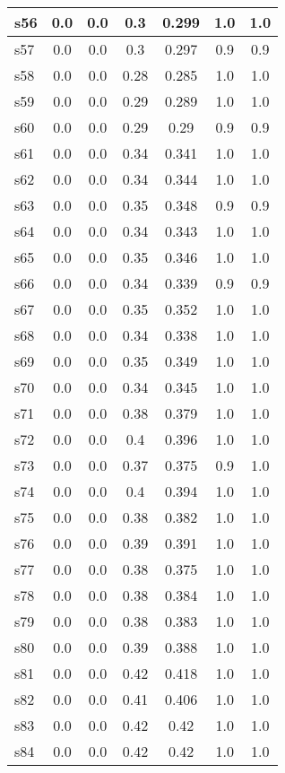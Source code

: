 \documentclass{article}
\begin{document}
\begin{tabular}{|l|c|c|c|c|c|c|}
\hline
s56 &0.0 & 0.0 & 0.3 & 0.299 & 1.0 & 1.0\\
\hline
s57 &0.0 & 0.0 & 0.3 & 0.297 & 0.9 & 0.9\\
\hline
s58 &0.0 & 0.0 & 0.28 & 0.285 & 1.0 & 1.0\\
\hline
s59 &0.0 & 0.0 & 0.29 & 0.289 & 1.0 & 1.0\\
\hline
s60 &0.0 & 0.0 & 0.29 & 0.29 & 0.9 & 0.9\\
\hline
s61 &0.0 & 0.0 & 0.34 & 0.341 & 1.0 & 1.0\\
\hline
s62 &0.0 & 0.0 & 0.34 & 0.344 & 1.0 & 1.0\\
\hline
s63 &0.0 & 0.0 & 0.35 & 0.348 & 0.9 & 0.9\\
\hline
s64 &0.0 & 0.0 & 0.34 & 0.343 & 1.0 & 1.0\\
\hline
s65 &0.0 & 0.0 & 0.35 & 0.346 & 1.0 & 1.0\\
\hline
s66 &0.0 & 0.0 & 0.34 & 0.339 & 0.9 & 0.9\\
\hline
s67 &0.0 & 0.0 & 0.35 & 0.352 & 1.0 & 1.0\\
\hline
s68 &0.0 & 0.0 & 0.34 & 0.338 & 1.0 & 1.0\\
\hline
s69 &0.0 & 0.0 & 0.35 & 0.349 & 1.0 & 1.0\\
\hline
s70 &0.0 & 0.0 & 0.34 & 0.345 & 1.0 & 1.0\\
\hline
s71 &0.0 & 0.0 & 0.38 & 0.379 & 1.0 & 1.0\\
\hline
s72 &0.0 & 0.0 & 0.4 & 0.396 & 1.0 & 1.0\\
\hline
s73 &0.0 & 0.0 & 0.37 & 0.375 & 0.9 & 1.0\\
\hline
s74 &0.0 & 0.0 & 0.4 & 0.394 & 1.0 & 1.0\\
\hline
s75 &0.0 & 0.0 & 0.38 & 0.382 & 1.0 & 1.0\\
\hline
s76 &0.0 & 0.0 & 0.39 & 0.391 & 1.0 & 1.0\\
\hline
s77 &0.0 & 0.0 & 0.38 & 0.375 & 1.0 & 1.0\\
\hline
s78 &0.0 & 0.0 & 0.38 & 0.384 & 1.0 & 1.0\\
\hline
s79 &0.0 & 0.0 & 0.38 & 0.383 & 1.0 & 1.0\\
\hline
s80 &0.0 & 0.0 & 0.39 & 0.388 & 1.0 & 1.0\\
\hline
s81 &0.0 & 0.0 & 0.42 & 0.418 & 1.0 & 1.0\\
\hline
s82 &0.0 & 0.0 & 0.41 & 0.406 & 1.0 & 1.0\\
\hline
s83 &0.0 & 0.0 & 0.42 & 0.42 & 1.0 & 1.0\\
\hline
s84 &0.0 & 0.0 & 0.42 & 0.42 & 1.0 & 1.0\\

\end{tabular}
\end{document}
